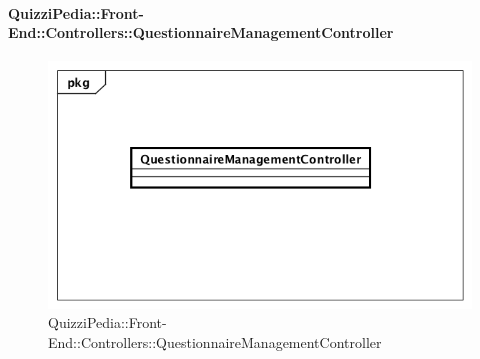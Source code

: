 \paragraph{QuizziPedia::Front-End::Controllers::QuestionnaireManagementController}
\begin{figure} [ht]
	\centering
	\includegraphics[scale=0.45]{UML/Classi/Front-End/QuizziPedia_Front-end_Controller_QuestionnaireManagementController.png}
	\caption{QuizziPedia::Front-End::Controllers::QuestionnaireManagementController}
\end{figure} \FloatBarrier
